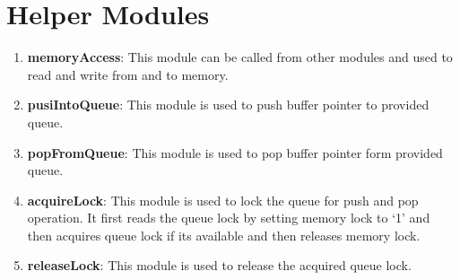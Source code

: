 \documentclass[12pt]{report}
\begin{document}
		\section{Helper Modules}
			\begin{enumerate}
				\item \textbf{memoryAccess}: This module can be called from other modules and used to read and write from and to memory. 
				\item \textbf{pusiIntoQueue}: This module is used to push buffer pointer to provided queue. 
				\item \textbf{popFromQueue}: This module is used to pop buffer pointer form provided queue. 
				\item \textbf{acquireLock}: This module is used to lock the queue for push and pop operation. It first reads the queue lock by setting memory lock to `1' and then acquires queue lock if its available and then releases memory lock.
				\item \textbf{releaseLock}: This module is used to release the acquired queue lock.
			\end{enumerate}	
\end{document}
